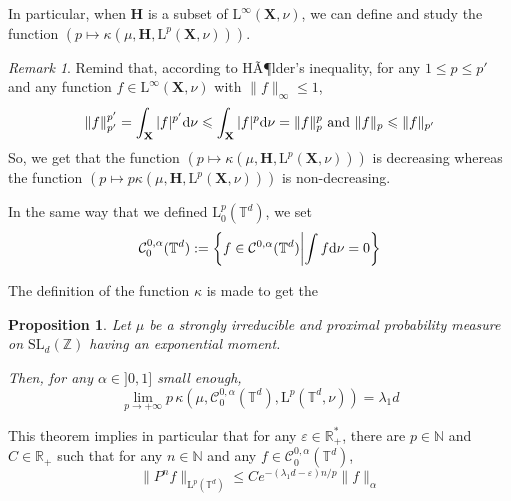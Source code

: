 \documentclass[11pt]{amsart}
\newtheorem{proposition}[theorem]{Proposition}
\theoremstyle{definition}
\theoremstyle{remark}
\newtheorem{remark}[theorem]{Remark}
\numberwithin{equation}{section}
\begin{document}
\bigskip
In particular, when ${\mathbf H}$ is a subset of $\mathrm{L}^\infty({\mathbf X},\nu)$, we can define and study the function $\left(p\mapsto \kappa(\mu,{\mathbf H}, \mathrm{L}^p\left({\mathbf X},\nu\right) )\right)$.

\begin{remark}\label{remark:kappa_decreasing}
Remind that, according to HÃ¶lder's inequality, for any $1\leqslant p\leqslant p'$ and any function $f\in \mathrm{L}^\infty ({\mathbf X},\nu)$ with $\|f\|_\infty\leqslant 1$,
\[
\|f\|_{p'}^{p'} = \int_{\mathbf X} |f|^{p'} {{\rm d}}\nu \leqslant \int_{\mathbf X} |f|^p {{\rm d}}\nu =\|f\|_p^p\text{ and }\|f\|_p \leqslant \|f\|_{p'}
\]
So, we get that the function $\left( p\mapsto \kappa(\mu,{\mathbf H}, \mathrm{L}^p\left({\mathbf X},\nu\right) )\right)$ is decreasing whereas the function $\left( p\mapsto p\kappa(\mu,{\mathbf H}, \mathrm{L}^p\left({\mathbf X},\nu\right) )\right)$ is non-decreasing.
\end{remark}

\bigskip
In the same way that we defined $\mathrm{L}^p_0({\mathbb T}^d)$, we set
\[
\mathcal{C}^{0,\alpha}_0({\mathbb T}^d) := \left\{f\in \mathcal{C}^{0,\alpha}({\mathbb T}^d) \middle| \int f{{\rm d}}\nu=0\right\}
\]

The definition of the function $\kappa$ is made to get the
\begin{proposition} \label{proposition:spectral_gap_bflm}
Let $\mu$ be a strongly irreducible and proximal probability measure on $\mathrm{SL}_d({\mathbb Z})$ having an exponential moment.

Then, for any $\alpha \in ]0,1]$ small enough,
\[
\lim_{p\to+\infty}  p\, \kappa\left(\mu,\mathcal{C}^{0,\alpha}_0\left({\mathbb T}^d\right), \mathrm{L}^p\left({\mathbb T}^d,\nu\right) \right) = \lambda_1 d
\]
\end{proposition}

This theorem implies in particular that for any $\varepsilon \in {\mathbb R}_+^\ast$, there are $p\in {\mathbb N}$ and $C\in {\mathbb R}_+$ such that for any $n\in {\mathbb N}$ and any $f\in \mathcal{C}^{0,\alpha}_0({\mathbb T}^d)$,
\[
\|P^n f\|_{\mathrm{L}^p({\mathbb T}^d)}\leqslant C e^{-(\lambda_1 d - \varepsilon) n/p} \|f\|_\alpha
\]
\end{document}
